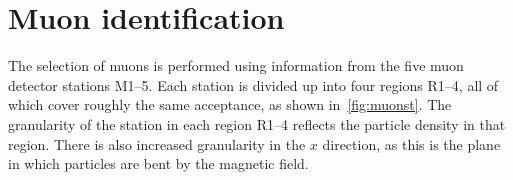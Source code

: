 




\section{Muon identification}
\label{sec:muonID}
The selection of muons is performed using information from the five muon detector stations M1--5. Each station is divided up into four regions R1--4, all of which cover roughly the same acceptance, as shown in~\autoref{fig:muonst}. The granularity of the station in each region R1--4 reflects the particle density in that region. There is also increased granularity in the $x$ direction, as this is the plane in which particles are bent by the magnetic field.

